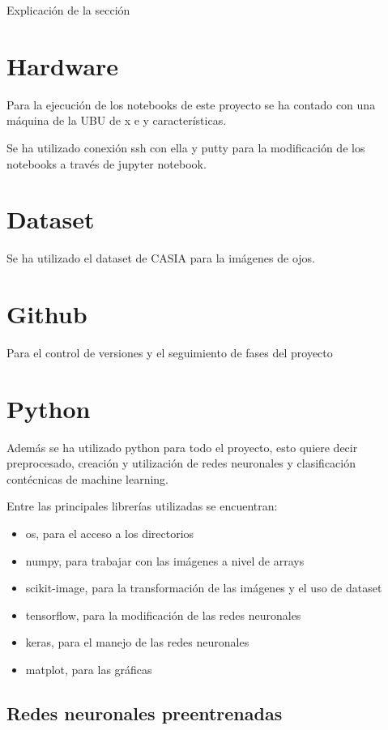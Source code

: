  \label{capitulo4}

Explicación de la sección

\section{Hardware}

Para la ejecución de los notebooks de este proyecto se ha contado con una máquina de la UBU de x e y características.

Se ha utilizado conexión ssh con ella y putty para la modificación de los notebooks a través de jupyter notebook.

\section{Dataset} 

Se ha utilizado el dataset de CASIA para la imágenes de ojos.

\section{Github}
Para el control de versiones y el seguimiento de fases del proyecto

\section{Python}

Además se ha utilizado python para todo el proyecto, esto quiere decir preprocesado, creación y utilización de redes neuronales y clasificación contécnicas de 
machine learning.

Entre las principales librerías utilizadas se encuentran:

\begin{itemize}
    \item os, para el acceso a los directorios
    \item numpy, para trabajar con las imágenes a nivel de arrays
    \item scikit-image, para la transformación de las imágenes y el uso de dataset
    \item tensorflow, para la modificación de las redes neuronales
    \item keras, para el manejo de las redes neuronales
    \item matplot, para las gráficas
\end{itemize}

\subsection{Redes neuronales preentrenadas}

